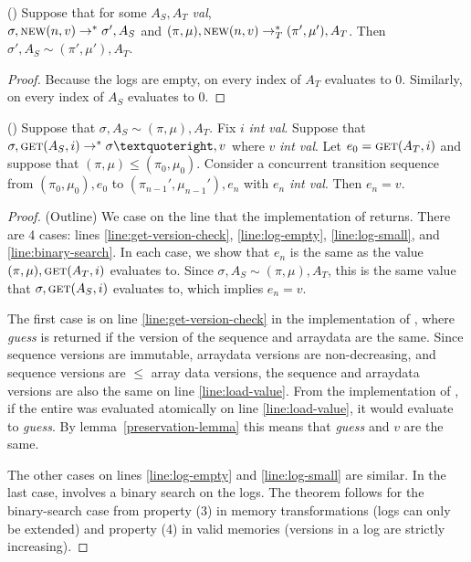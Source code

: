 \begin{theorem}
(\new{}) Suppose that for some $A_S, A_T$ \emph{val}, \\$\sigma, \text{{\sc new}}{}(n, v) \to^* \sigma', A_S$ and $(\pi, \mu), \text{{\sc new}}{}(n,v) \to^*_T (\pi', \mu'), A_T$. Then $\sigma', A_S \sim (\pi', \mu'), A_T$.
\end{theorem}

\begin{proof}
Because the logs are empty, \get{} on every index of $A_T$ evaluates to 0. Similarly, \get{} on every index of $A_S$ evaluates to 0.
\end{proof}

\begin{theorem}
\label{thm-get}
(\get{}) Suppose that $\sigma, A_S \sim (\pi, \mu), A_T$. Fix $i$ \emph{int val}. Suppose that $\sigma, \tget{}(A_S, i) \to^* \sigma’, v$ where $v$ \emph{int val}. Let $e_0 = \text{{\sc get}}{}(A_T, i)$ and suppose that $(\pi, \mu) \leq (\pi_0, \mu_0)$. Consider a concurrent transition sequence from $(\pi_0, \mu_0), e_0$ to $(\pi_{n-1}', \mu_{n-1}'), e_n$ with $e_n$ \emph{int val}. Then $e_n = v$.
\end{theorem}

\begin{proof}
(Outline) We case on the line that the implementation of \get{} returns. There are 4 cases: lines \ref{line:get-version-check}, \ref{line:log-empty}, \ref{line:log-small}, and \ref{line:binary-search}. In each case, we show that $e_n$ is the same as the value $(\pi, \mu), \text{{\sc get}}{}(A_T, i)$ evaluates to. Since $\sigma, A_S \sim (\pi, \mu), A_T$, this is the same value that $\sigma, \text{{\sc get}}{}(A_S, i)$ evaluates to, which implies $e_n = v$.

The first case is on line \ref{line:get-version-check} in the implementation of \get{}, where \emph{guess} is returned if the version of the sequence and arraydata are the same. Since sequence versions are immutable, arraydata versions are non-decreasing, and sequence versions are $\leq$ array data versions, the sequence and arraydata versions are also the same on line \ref{line:load-value}. From the implementation of \get{}, if the entire \get{} was evaluated atomically on line \ref{line:load-value}, it would evaluate to \emph{guess}. By lemma~\ref{preservation-lemma} this means that \emph{guess} and $v$ are the same.

The other cases on lines \ref{line:log-empty} and \ref{line:log-small} are similar. In the last case, \get{} involves a binary search on the logs. The theorem follows for the binary-search case from property (3) in memory transformations (logs can only be extended) and property (4) in valid memories (versions in a log are strictly increasing).
\end{proof}

